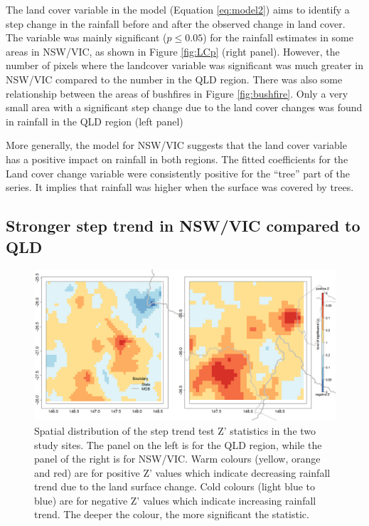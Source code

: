\documentclass[fleqn,10pt,lineno]{wlpeerj} %
\theoremstyle{definition}
\theoremstyle{definition}
\theoremstyle{definition}
\theoremstyle{remark}
\begin{document}
The land cover variable in the model (Equation \eqref{eq:model2}) aims to
identify a step change in the rainfall before and after the observed
change in land cover. The variable was mainly significant
(\(p \leq 0.05\)) for the rainfall estimates in some areas in NSW/VIC,
as shown in Figure \ref{fig:LCp} (right panel). However, the number of
pixels where the landcover variable was significant was much greater in
NSW/VIC compared to the number in the QLD region. There was also some
relationship between the areas of bushfires in Figure
\ref{fig:bushfire}. Only a very small area with a significant step
change due to the land cover changes was found in rainfall in the QLD
region (left panel)

More generally, the model for NSW/VIC suggests that the land cover
variable has a positive impact on rainfall in both regions. The fitted
coefficients for the Land cover change variable were consistently
positive for the ``tree'' part of the series. It implies that rainfall
was higher when the surface was covered by trees.

\subsection{Stronger step trend in NSW/VIC compared to
QLD}\label{stronger-step-trend-in-nswvic-compared-to-qld}

\begin{figure}
\includegraphics[width=0.9\linewidth]{figures/step_new} \caption{Spatial distribution of the step trend test Z' statistics in the two study sites. The panel on the left is for the QLD region, while the panel of the right is for NSW/VIC. Warm colours (yellow, orange and red) are for positive Z' values which indicate decreasing rainfall trend due to the land surface change. Cold colours (light blue to blue) are for negative Z' values which indicate increasing rainfall trend. The deeper the colour, the more significant the statistic.}\label{fig:steptest30}
\end{figure}
\end{document}
